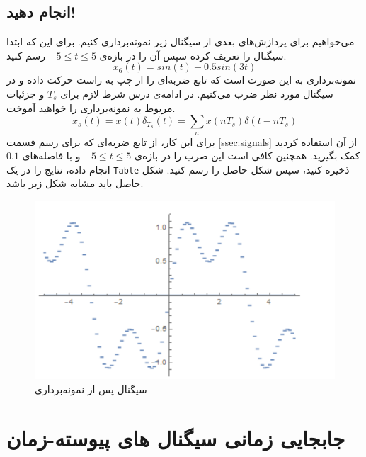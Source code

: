 \documentclass{utsignal}
\begin{document}
	\subsection{انجام دهید!}
	می‌خواهیم برای پردازش‌های بعدی از سیگنال زیر نمونه‌برداری کنیم. برای این که ابتدا سیگنال را تعریف کرده سپس آن را در بازه‌ی $-5 \le t \le 5$ رسم کنید.
	$$x_6(t) = sin(t) + 0.5 sin(3t)$$
	نمونه‌برداری به این صورت است که تابع ضربه‌ای را از چپ به راست حرکت داده و در سیگنال مورد نظر ضرب می‌کنیم. در ادامه‌ی درس شرط لازم برای $T_s$ و جزئیات مریوط به نمونه‌برداری را خواهید آموخت.
	$$x_s(t) = x(t)\delta_{T_s}(t) = \sum_{n} x(nT_s)\delta(t-nT_s)$$
	برای این کار، از تابع ضربه‌ای که برای رسم قسمت \ref{ssec:signals} از آن استفاده کردید کمک بگیرید. همچنین کافی است این ضرب را در بازه‌ی $-5 \le t \le 5$ و با فاصله‌های $0.1$ انجام داده، نتایج را در یک \lstinline{Table} ذخیره کنید، سپس شکل حاصل را رسم کنید. شکل حاصل باید مشابه شکل زیر باشد.
	\begin{figure}[h]
		\centering
		\includegraphics[height=0.3\textheight,keepaspectratio]{sample.png}
		\caption{سیگنال پس از نمونه‌برداری}
	\end{figure}
	
	\section{جابجایی زمانی سیگنال های پیوسته-زمان}
\end{document}
